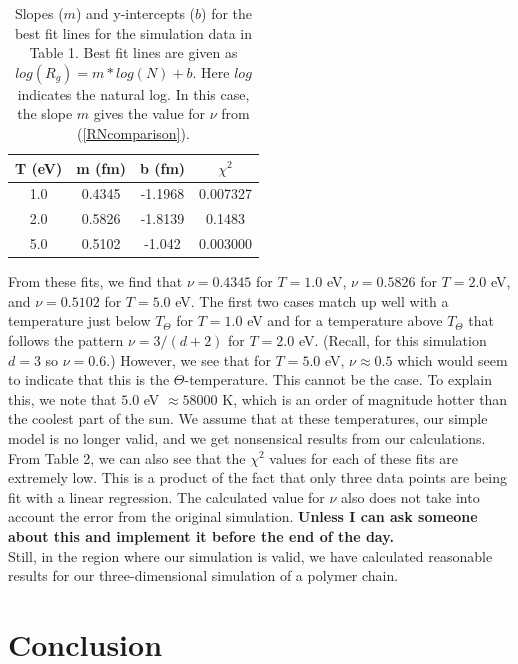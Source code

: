 \documentclass{article}
\begin{document}
\begin{multicols}{2}
\begin{table}
\begin{center}
\begin{tabular}{| c | c | c | c |}
\hline \textbf{T (eV)} & \textbf{m (fm)} & \textbf{b (fm)} & \textbf{$\chi ^2$} \\ \hline
1.0 & 0.4345 & -1.1968 & 0.007327 \\ \hline
2.0 & 0.5826 & -1.8139 & 0.1483 \\ \hline
5.0 & 0.5102 & -1.042 & 0.003000 \\ \hline
\end{tabular}
\caption{Slopes ($m$) and y-intercepts ($b$) for the best fit lines for the simulation data in Table 1.  Best fit lines are given as $log(R_g) = m*log(N) + b$.  Here $log$ indicates the natural log.  In this case, the slope $m$ gives the value for $\nu$ from (\ref{RNcomparison}).}
\end{center}
\end{table}

From these fits, we find that $\nu = 0.4345$ for $T=1.0$ eV, $\nu = 0.5826$ for $T = 2.0$ eV, and $\nu = 0.5102$ for $T = 5.0$ eV.  The first two cases match up well with a temperature just below $T_{\Theta}$ for $T=1.0$ eV and for a temperature above $T_{\Theta}$ that follows the pattern $\nu = 3/(d+2)$ for $T = 2.0$ eV.  (Recall, for this simulation $d=3$ so $\nu = 0.6$.)  However, we see that for $T = 5.0$ eV, $\nu \approx 0.5$ which would seem to indicate that this is the $\Theta$-temperature. This cannot be the case.  To explain this, we note that $5.0$ eV $\approx 58000$ K, which is an order of magnitude hotter than the coolest part of the sun.  \cite{sun}  We assume that at these temperatures, our simple model is no longer valid, and we get nonsensical results from our calculations.  \\

From Table 2, we can also see that the $\chi^2$ values for each of these fits are extremely low.  This is a product of the fact that only three data points are being fit with a linear regression.  The calculated value for $\nu$ also does not take into account the error from the original simulation.  \textbf{Unless I can ask someone about this and implement it before the end of the day.} \\

Still, in the region where our simulation is valid, we have calculated reasonable results for our three-dimensional simulation of a polymer chain.  

\section{Conclusion}
\label{concl}


\end{multicols}
\end{document}
